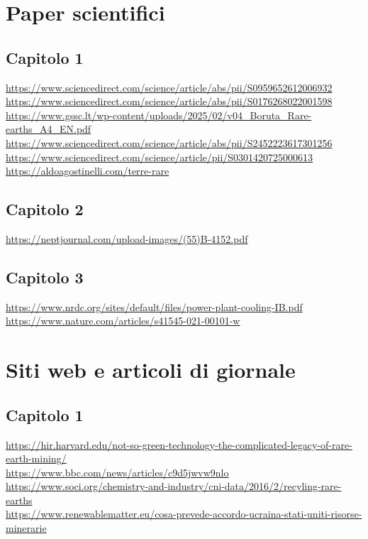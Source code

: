 \documentclass[12pt,a4paper,oneside]{book}
\begin{document}

\section*{Paper scientifici}
\subsection*{Capitolo 1}
\sloppy

\url{https://www.sciencedirect.com/science/article/abs/pii/S0959652612006932} \\
\url{https://www.sciencedirect.com/science/article/abs/pii/S0176268022001598} \\
\url{https://www.gssc.lt/wp-content/uploads/2025/02/v04_Boruta_Rare-earths_A4_EN.pdf} \\
\url{https://www.sciencedirect.com/science/article/abs/pii/S2452223617301256} \\
\url{https://www.sciencedirect.com/science/article/pii/S0301420725000613}\\
\url{https://aldoagostinelli.com/terre-rare}

\subsection*{Capitolo 2}
\url{https://neptjournal.com/upload-images/(55)B-4152.pdf}

\subsection*{Capitolo 3}
\url{https://www.nrdc.org/sites/default/files/power-plant-cooling-IB.pdf}\\
\url{https://www.nature.com/articles/s41545-021-00101-w}

\section*{Siti web e articoli di giornale}
\subsection*{Capitolo 1}
\url{https://hir.harvard.edu/not-so-green-technology-the-complicated-legacy-of-rare-earth-mining/} \\
\url{https://www.bbc.com/news/articles/c9d5jwvw9nlo} \\
\url{https://www.soci.org/chemistry-and-industry/cni-data/2016/2/recyling-rare-earths}\\
\url{https://www.renewablematter.eu/cosa-prevede-accordo-ucraina-stati-uniti-risorse-minerarie}
\end{document}
